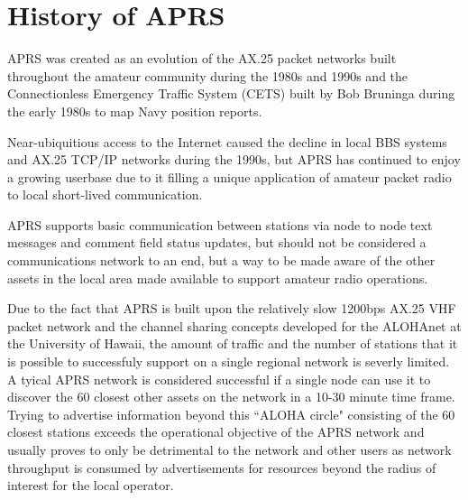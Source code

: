 \section{History of APRS}

APRS was created as an evolution of the AX.25 packet networks
built throughout the amateur community during the 1980s and 1990s and 
the Connectionless Emergency Traffic System (CETS) built by 
Bob Bruninga during the early 1980s to map Navy position reports.

Near-ubiquitious access to the Internet caused the decline in local BBS 
systems and AX.25 TCP/IP networks during the 1990s, but APRS has 
continued to enjoy a growing userbase due to it filling a unique 
application of amateur packet radio to local short-lived communication.

APRS supports basic communication between stations via node to node 
text messages and comment field status updates, but should not be 
considered a communications network to an end, but a way to be made aware
of the other assets in the local area made available to support amateur 
radio operations.

Due to the fact that APRS is built upon the relatively slow 
1200bps AX.25 VHF packet
network and the channel sharing concepts developed for the ALOHAnet at
the University of Hawaii, the amount of 
traffic and the number of stations that it is possible to successfuly 
support on a single regional network is severly limited. 
A tyical APRS network is considered successful if a single node
can use it to discover the 60 closest other assets on the network in a
10-30 minute time frame. Trying to advertise information beyond this
``ALOHA circle" consisting of the 60 closest stations exceeds the 
operational objective of the APRS network and usually proves to only be 
detrimental to the network and other users as network throughput is 
consumed by advertisements for 
resources beyond the radius of interest for the local operator.

